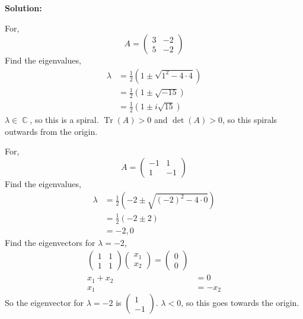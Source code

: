 \documentclass[12pt]{article}
\DeclareMathOperator{\Tr}{Tr}
\DeclareMathOperator{\CC}{\mathbb{C}}
\newenvironment{solution}{
    \textbf{Solution:}
    
}{
    
    \vspace{2em}
}
\begin{document}
\begin{solution}
    For,
    \[
        A = \begin{pmatrix}
            3 & -2 \\
            5 & -2
        \end{pmatrix}
    \]
    Find the eigenvalues,
    \[
        \begin{aligned}
            \lambda &= \frac{1}{2}(1 \pm \sqrt{ 1^2 - 4 \cdot 4}) \\
            &= \frac{1}{2}(1 \pm \sqrt{-15}) \\
            &= \frac{1}{2}(1 \pm i \sqrt{15})
        \end{aligned}
    \]
    \(\lambda \in \CC\), so this is a spiral. \(\Tr(A) > 0\) and \(\det(A) > 0\), so this spirals outwards from the origin.


    For,
    \[
        A = \begin{pmatrix}
            -1 & 1 \\
            1 & -1
        \end{pmatrix}
    \]
    Find the eigenvalues,
    \[
        \begin{aligned}
            \lambda &= \frac{1}{2}(-2 \pm \sqrt{(-2)^2 - 4 \cdot 0})\\
            &= \frac{1}{2}(-2 \pm 2) \\
            &= -2, 0
        \end{aligned}
    \]
    Find the eigenvectors for \(\lambda = -2\),
    \[
        \begin{aligned}
            \begin{pmatrix}
                1 & 1 \\
                1 & 1
            \end{pmatrix} \begin{pmatrix} x_1 \\ x_2 \end{pmatrix} = \begin{pmatrix} 0 \\ 0 \end{pmatrix} \\
            x_1 + x_2 &= 0 \\
            x_1 &= -x_2
        \end{aligned}
    \]
    So the eigenvector for \(\lambda = -2\) is \(\begin{pmatrix} 1 \\ -1 \end{pmatrix}\). \(\lambda < 0 \), so this goes towards the origin.


\end{solution}
\end{document}
